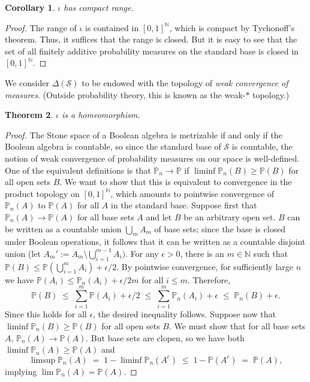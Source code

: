 \documentclass[12pt]{article}
\newcommand{\PP}{\mathbb{P}}
\newcommand{\NN}{\mathbb{N}}
\newcommand{\cS}{\mathcal{S}}
\theoremstyle{plain}
\newtheorem{theorem}{Theorem}[subsection]
\newtheorem{corollary}[theorem]{Corollary}
\theoremstyle{definition}
\theoremstyle{remark}
\begin{document}
\begin{corollary}
$\iota$ has compact range.
\end{corollary}
\begin{proof}
The range of $\iota$ is contained in $[0,1]^\NN$, which is compact by Tychonoff's theorem. Thus, it suffices that the range is closed. But it is easy to see that the set of all finitely additive probability measures on the standard base is closed in $[0,1]^\NN$.
\end{proof}
We consider $\Delta(\cS)$ to be endowed with the topology of \emph{weak convergence of measures}. (Outside probability theory, this is known as the weak-$*$ topology.)
\begin{theorem}
$\iota$ is a homeomorphism.
\end{theorem}
\begin{proof}
The Stone space of a Boolean algebra is metrizable if and only if the Boolean algebra is countable, so since the standard base of $\cS$ is countable, the notion of weak convergence of probability measures on our space is well-defined. One of the equivalent definitions is that $\PP_n\to\PP$ if $\liminf\PP_n(B)\ge\PP(B)$ for all open sets $B$. We want to show that this is equivalent to convergence in the product topology on $[0,1]^\NN$, which amounts to pointwise convergence of $\PP_n(A)$ to $\PP(A)$ for all $A$ in the standard base.
Suppose first that $\PP_n(A)\to\PP(A)$ for all base sets $A$ and let $B$ be an arbitrary open set. $B$ can be written as a countable union $\textstyle\bigcup_m A_m$ of base sets; since the base is closed under Boolean operations, it follows that it can be written as a countable disjoint union (let $\textstyle A_m' := A_m\setminus\bigcup_{i=1}^{m-1}A_i)$. For any $\epsilon>0$, there is an $m\in\mathbb{N}$ such that $\textstyle\PP(B)\le\PP(\bigcup_{i=1}^m A_i)+\epsilon/2$. By pointwise convergence, for sufficiently large $n$ we have $\PP(A_i)\le\PP_n(A_i) + \epsilon/2m$ for all $i\le m$. Therefore,
\[
\textstyle\PP(B)\;\le\;\sum_{i=1}^m\PP(A_i)+\epsilon/2\;\le\;\sum_{i=1}^m\PP_n(A_i) + \epsilon\;\le\;\PP_n(B)+\epsilon.
\]
Since this holds for all $\epsilon$, the desired inequality follows.
Suppose now that $\liminf\PP_n(B)\ge\PP(B)$ for all open sets $B$. We must show that for all base sets $A$, $\PP_n(A)\to\PP(A)$. But base sets are clopen, so we have both $\liminf\PP_n(A)\ge\PP(A)$ and
\[
\limsup\PP_n(A) \;=\; 1-\liminf\PP_n(A^c) \;\le\; 1 - \PP(A^c) \;=\; \PP(A),
\]
implying $\lim\PP_n(A) = \PP(A)$.
\end{proof}
\end{document}
